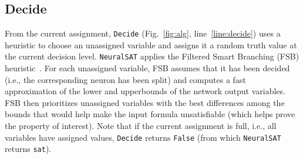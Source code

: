 \documentclass[oneside,11pt,dvipsnames]{book}
\numberwithin{equation}{section}
\theoremstyle{definition}
\theoremstyle{remark}
\newcommand{\tool}{\texttt{NeuralSAT}}
\begin{document}
\subsection{Decide}\label{sec:decide}

From the current assignment, \texttt{Decide} (Fig.~\ref{fig:alg}, line~\ref{line:decide}) uses a heuristic to choose an unassigned variable and assigns it a random truth value at the current decision level.
\tool{} applies the Filtered Smart Branching (FSB) heuristic~\cite{bunel2018unified,de2021improved}. For each unassigned variable, FSB assumes that it has been decided (i.e., the corresponding neuron has been split) and computes a fast approximation of the lower and upperbounds of the network output variables.  FSB then prioritizes unassigned variables with the best differences among the bounds that would help make the input formula unsatisfiable (which helps prove the property of interest).
Note that if the current assignment is full, i.e., all variables have assigned values, \texttt{Decide} returns \texttt{False} (from which \tool{} returns \texttt{sat}).






\end{document}
